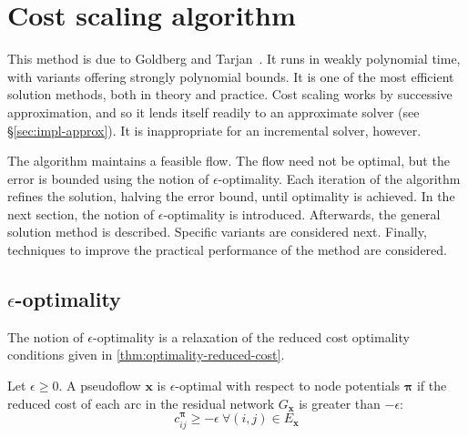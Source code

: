 \section{Cost scaling algorithm}

This method is due to Goldberg and Tarjan~\cite{Goldberg:1987}. It runs in weakly polynomial time, with variants offering strongly polynomial bounds. It is one of the most efficient solution methods, both in theory and practice\footnotemark. Cost scaling works by successive approximation, and so it lends itself readily to an approximate solver (see \S\ref{sec:impl-approx}). It is inappropriate for an incremental solver, however.

The algorithm maintains a feasible flow. The flow need not be optimal, but the error is bounded using the notion of $\epsilon$-optimality. Each iteration of the algorithm refines the solution, halving the error bound, until optimality is achieved. In the next section, the notion of $\epsilon$-optimality is introduced. Afterwards, the general solution method is described. Specific variants are considered next. Finally, techniques to improve the practical performance of the method are considered.

\subsection{$\epsilon$-optimality}

The notion of $\epsilon$-optimality is a relaxation of the reduced cost optimality conditions given in \cref{thm:optimality-reduced-cost}.

\begin{defn} \label{defn:epsilon-optimality}
Let $\epsilon \geq 0$. A pseudoflow $\mathbf{x}$ is $\epsilon$-optimal with respect to node potentials $\boldsymbol{\pi}$ if the reduced cost of each arc in the residual network $G_\mathbf{x}$ is greater than $-\epsilon$:
\begin{equation} \label{eq:epsilon-optimality}
c^{\boldsymbol{\pi}}_{ij} \geq -\epsilon\:\forall (i,j) \in E_{\mathbf{x}}
\end{equation}
\end{defn}

